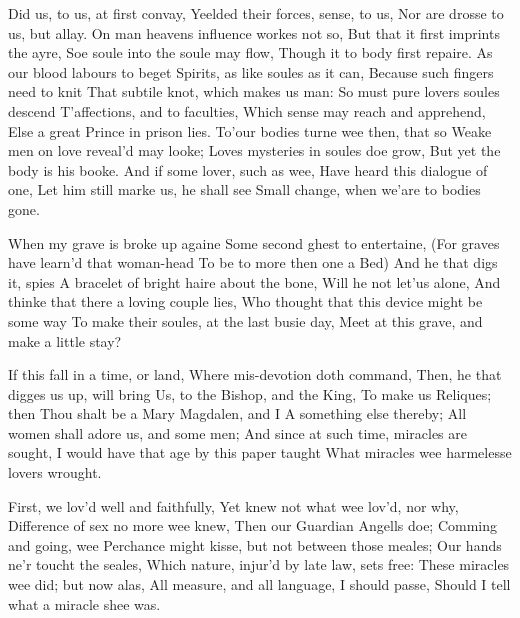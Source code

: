 \documentclass{book}
\newenvironment{poem}[1]%
  {\poemtitle{#1}%
   \Versus
   \numerus{1}%
  }
  {\endVersus}
\begin{document}
\begin{poem}{The Extasie}
    Did us, to us, at first convay,        
  Yeelded their forces, sense, to us,       
    Nor are drosse to us, but allay.        
  On man heavens influence workes not so,        
    But that it first imprints the ayre,        
  Soe soule into the soule may flow,        
    Though it to body first repaire.       
  As our blood labours to beget        
    Spirits, as like soules as it can,        
  Because such fingers need to knit        
    That subtile knot, which makes us man:        
  So must pure lovers soules descend       
    T'affections, and to faculties,        
  Which sense may reach and apprehend,        
    Else a great Prince in prison lies.        
  To'our bodies turne wee then, that so        
    Weake men on love reveal'd may looke;       
  Loves mysteries in soules doe grow,        
    But yet the body is his booke.        
  And if some lover, such as wee,        
    Have heard this dialogue of one,        
  Let him still marke us, he shall see       
    Small change, when we'are to bodies gone.        
\end{poem}      
      
    
\begin{poem}{The Relique} %
\Forma {}
      
      When my grave is broke up againe  \auto      
      Some second ghest to entertaine,        
      (For graves have learn'd that woman-head        
      To be to more then one a Bed)        
          And he that digs it, spies       
  A bracelet of bright haire about the bone,        
          Will he not let'us alone,        
  And thinke that there a loving couple lies,        
  Who thought that this device might be some way        
  To make their soules, at the last busie day,       
  Meet at this grave, and make a little stay?        
       
          If this fall in a time, or land,        
          Where mis-devotion doth command,        
          Then, he that digges us up, will bring        
          Us, to the Bishop, and the King,       
            To make us Reliques; then        
  Thou shalt be a Mary Magdalen, and I        
            A something else thereby;        
  All women shall adore us, and some men;        
  And since at such time, miracles are sought,       
  I would have that age by this paper taught        
  What miracles wee harmelesse lovers wrought.        
       
          First, we lov'd well and faithfully,        
          Yet knew not what wee lov'd, nor why,        
          Difference of sex no more wee knew,       
          Then our Guardian Angells doe;        
            Comming and going, wee        
  Perchance might kisse, but not between those meales;        
            Our hands ne'r toucht the seales,        
  Which nature, injur'd by late law, sets free:       
  These miracles wee did; but now alas,        
  All measure, and all language, I should passe,        
  Should I tell what a miracle shee was.        
\end{poem}      
\end{document}
